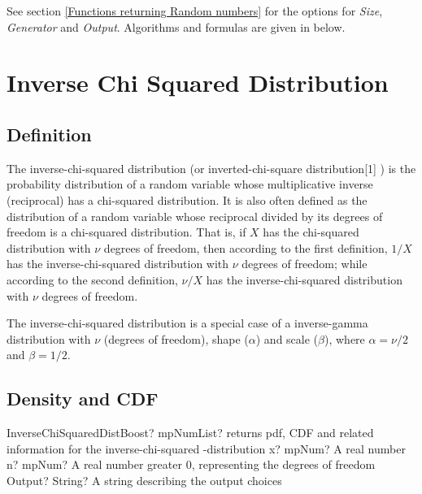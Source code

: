 \vspace{0.3cm}

See section \ref{Functions returning Random numbers} for the options for  {\itshape\sffamily Size},  {\itshape\sffamily Generator} and {\itshape\sffamily Output}. Algorithms and formulas are given in below.





\section{Inverse Chi Squared Distribution}


\subsection{Definition}
\label{InverseChiSquaredDistributionDefinition}

The inverse-chi-squared distribution (or inverted-chi-square distribution[1] ) is the probability distribution of a random variable whose multiplicative inverse (reciprocal) has a chi-squared distribution. It is also often defined as the distribution of a random variable whose reciprocal divided by its degrees of freedom is a chi-squared distribution. That is, if $X$ has the chi-squared distribution with $\nu$  degrees of freedom, then according to the first definition, $1/X$ has the inverse-chi-squared distribution with  $\nu$  degrees of freedom; while according to the second definition, $\nu/X$ has the inverse-chi-squared distribution with  $\nu$  degrees of freedom. 

The inverse-chi-squared distribution is a special case of a inverse-gamma distribution with $\nu$ (degrees of freedom), shape ($\alpha$) and scale ($\beta$), where $\alpha=\nu/2$ and $\beta=1/2$.



\subsection{Density and CDF}

\begin{mpFunctionsExtract}
	\mpFunctionThree
	{InverseChiSquaredDistBoost? mpNumList? returns pdf, CDF and related information for the inverse-chi-squared -distribution}
	{x? mpNum? A real number}
	{n? mpNum? A real number greater 0, representing the degrees of freedom}
	{Output? String? A string describing the output choices}
\end{mpFunctionsExtract}


